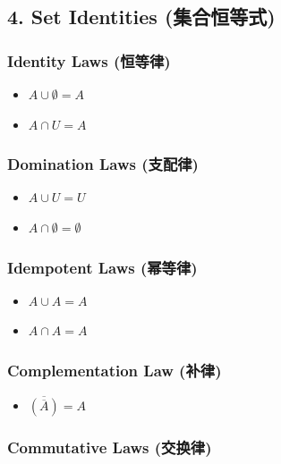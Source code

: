 \documentclass[10pt,a4paper,openany]{ctexbook}
\theoremstyle{definition}
\theoremstyle{remark}
\begin{document}
\subsection{4. Set Identities (集合恒等式)}

\subsubsection{Identity Laws (恒等律)}

\begin{itemize}
\item $A \cup \emptyset = A$
\item $A \cap U = A$

\end{itemize}

\subsubsection{Domination Laws (支配律)}

\begin{itemize}
\item $A \cup U = U$
\item $A \cap \emptyset = \emptyset$

\end{itemize}

\subsubsection{Idempotent Laws (幂等律)}

\begin{itemize}
\item $A \cup A = A$
\item $A \cap A = A$

\end{itemize}

\subsubsection{Complementation Law (补律)}

\begin{itemize}
\item $\overline{(\overline{A})} = A$

\end{itemize}

\subsubsection{Commutative Laws (交换律)}
\end{document}

